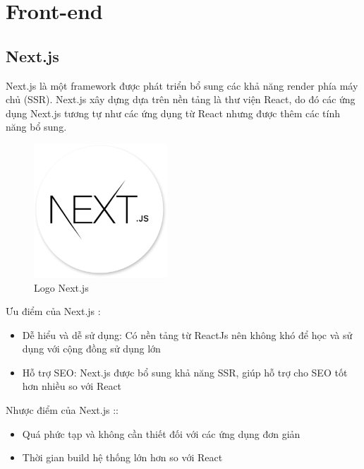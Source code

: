 
\section{Front-end}
\subsection{Next.js}

\hspace*{0.5cm} Next.js là một framework được phát triển bổ sung các khả năng render phía máy chủ (SSR). Next.js xây dựng dựa trên nền tảng là thư viện React, do đó các ứng dụng Next.js tương tự như các ứng dụng từ React nhưng được thêm các tính năng bổ sung.\\

\begin{figure}[!htp]
    \begin{center}
        \includegraphics[width=5cm]{img/Technology/next.png}
    \end{center}
    \caption{Logo Next.js \cite{technologyNextjs}}
\end{figure}

Ưu điểm của Next.js \cite{technologyNextAdvance}:
\begin{itemize}
    \item Dễ hiểu và dễ sử dụng: Có nền tảng từ ReactJs nên không khó để học và sử dụng với cộng đồng sử dụng lớn
    \item Hỗ trợ SEO: Next.js được bổ sung khả năng SSR, giúp hỗ trợ cho SEO tốt hơn nhiều so với React
\end{itemize}

Nhược điểm của Next.js \cite{technologyNextAdvance}::
\begin{itemize}
    \item Quá phức tạp và không cần thiết đối với các ứng dụng đơn giản
    \item Thời gian build hệ thống lớn hơn so với React
\end{itemize}

